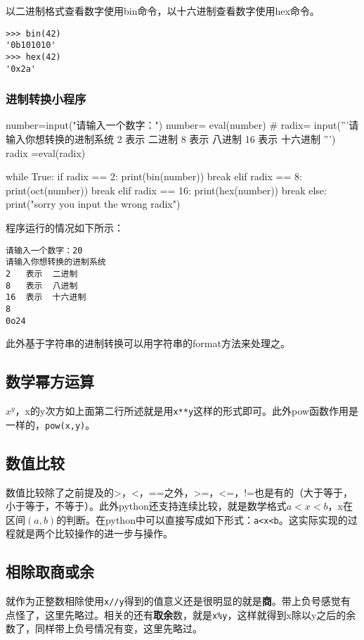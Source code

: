 \documentclass[12pt,oneside]{book}
\begin{document}
\begin{common-format}
以二进制格式查看数字使用bin命令，以十六进制查看数字使用hex命令。
\begin{Verbatim}
>>> bin(42)
'0b101010'
>>> hex(42)
'0x2a'
\end{Verbatim}

\subsubsection{进制转换小程序}

\begin{tcbpython}[]
number=input("请输入一个数字：")
number= eval(number)
#
radix= input('''请输入你想转换的进制系统
2   表示  二进制
8   表示  八进制
16  表示  十六进制
''')
radix =eval(radix)

while True:
    if radix == 2:
        print(bin(number))
        break
    elif radix == 8:
        print(oct(number))
        break
    elif radix == 16:
        print(hex(number))
        break
    else:
        print("sorry you input the wrong radix")
\end{tcbpython}
程序运行的情况如下所示：
\begin{Verbatim}
请输入一个数字：20
请输入你想转换的进制系统
2   表示  二进制
8   表示  八进制
16  表示  十六进制
8
0o24
\end{Verbatim}

此外基于字符串的进制转换可以用字符串的format方法来处理之。



\subsection{数学幂方运算}
$ x^y $，x的y次方如上面第二行所述就是用\verb+x**y+这样的形式即可。此外pow函数作用是一样的，\verb+pow(x,y)+。


\subsection{数值比较}
数值比较除了之前提及的>，<，==之外，>=，<=，!=也是有的（大于等于，小于等于，不等于）。此外python还支持连续比较，就是数学格式$a<x<b$，x在区间$(a,b)$的判断。在python中可以直接写成如下形式：\verb+a<x<b+。这实际实现的过程就是两个比较操作的进一步与操作。

\subsection{相除取商或余}
就作为正整数相除使用\verb+x//y+得到的值意义还是很明显的就是\textbf{商}。带上负号感觉有点怪了，这里先略过。相关的还有\textbf{取余}数，就是\verb+x%y+，这样就得到x除以y之后的余数了，同样带上负号情况有变，这里先略过。




\end{common-format}
\end{document}
